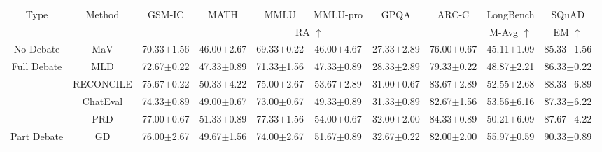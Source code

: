 \begin{table}
\small
  \centering
  \setlength{\tabcolsep}{1mm}
  \begin{tabular}{c|c|cccccc|cc}
\toprule
\multirow{2}{*}{Type}    & \multirow{2}{*}{Method}                      & GSM-IC               & MATH                 & MMLU                 & MMLU-pro             & GPQA                 & ARC-C        & LongBench            & SQuAD                \\ \cmidrule{3-10}
&               & \multicolumn{6}{c|}{RA $\uparrow$}    & M-Avg $\uparrow$    & EM $\uparrow$  \\ \midrule
No Debate            & MaV       & 70.33{\tiny $\pm$1.56}          & 46.00{\tiny $\pm$2.67}          & 69.33{\tiny $\pm$0.22}          & 46.00{\tiny $\pm$4.67}          & 27.33{\tiny $\pm$2.89}          & 76.00{\tiny $\pm$0.67}          & 45.11{\tiny $\pm$1.09}          & 85.33{\tiny $\pm$1.56}          \\ \midrule
\multirow{4}{*}{Full Debate}   & MLD        & 72.67{\tiny $\pm$0.22}          & 47.33{\tiny $\pm$0.89}          & 71.33{\tiny $\pm$1.56}          & 47.33{\tiny $\pm$0.89}          & 28.33{\tiny $\pm$2.89}          & 79.33{\tiny $\pm$0.22}          & 48.87{\tiny $\pm$2.21}          & 86.33{\tiny $\pm$0.22}          \\
& RECONCILE         & 75.67{\tiny $\pm$0.22}          & 50.33{\tiny $\pm$4.22}          & 75.00{\tiny $\pm$2.67}          & 53.67{\tiny $\pm$2.89}          & 31.00{\tiny $\pm$0.67}          & 83.67{\tiny $\pm$2.89}          & 52.55{\tiny $\pm$2.68}          & 88.33{\tiny $\pm$6.89}          \\
& ChatEval          & 74.33{\tiny $\pm$0.89}          & 49.00{\tiny $\pm$0.67}          & 73.00{\tiny $\pm$0.67}          & 49.33{\tiny $\pm$0.89}          & 31.33{\tiny $\pm$0.89}          & 82.67{\tiny $\pm$1.56}          & 53.56{\tiny $\pm$6.16}          & 87.33{\tiny $\pm$6.22}          \\
& PRD               & 77.00{\tiny $\pm$0.67}          & 51.33{\tiny $\pm$0.89}          & 77.33{\tiny $\pm$1.56}          & 54.00{\tiny $\pm$0.67}          & 32.00{\tiny $\pm$2.00}          & 84.33{\tiny $\pm$0.89}          & 50.21{\tiny $\pm$6.09}          & 87.67{\tiny $\pm$4.22}          \\  \midrule
\multirow{3}{*}{Part Debate}                       &GD                       & 76.00{\tiny $\pm$2.67}          & 49.67{\tiny $\pm$1.56}          & 74.00{\tiny $\pm$2.67}          & 51.67{\tiny $\pm$0.89}          & 32.67{\tiny $\pm$0.22}          & 82.00{\tiny $\pm$2.00}          & 55.97{\tiny $\pm$0.59}          & 90.33{\tiny $\pm$0.89}          \\

\end{tabular}
\end{table}
